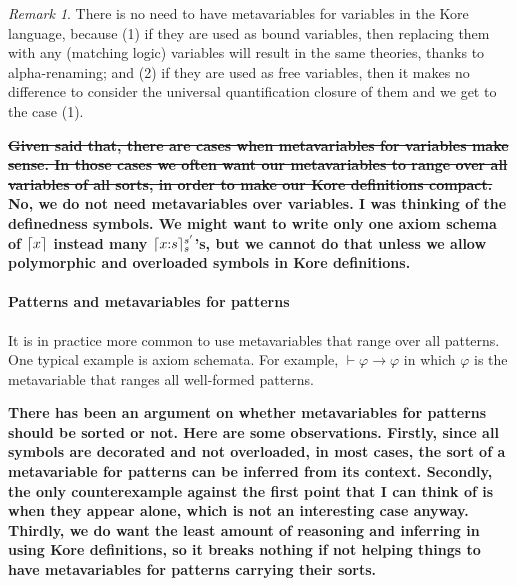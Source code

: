 \documentclass[UTF8]{article}
\newcommand{\comment}[1]
    {\par {\bfseries \color{blue} #1 \par}} %
\newcounter{thmcounter}
\theoremstyle{plain}
\theoremstyle{definition}
\theoremstyle{remark}
\newtheorem{remark}[thmcounter]{Remark}
\newcommand{\cln}{{:}}
\DeclarePairedDelimiter{\ceil}{\lceil}{\rceil}
\begin{document}
\begin{remark}
\label{no_need_to_have_metavariables_for_variables}
There is no need to have metavariables for variables in the Kore language, because (1) if they are used as bound variables, then replacing them with any (matching logic) variables will result in the same theories, thanks to alpha-renaming; and (2) if they are used as free variables, then it makes no difference to consider the universal quantification closure of them and we get to the case (1). 
\comment{\sout{Given said that, there are cases when metavariables for variables make sense. In those cases we often want our metavariables to range over all variables of all sorts, in order to make our Kore definitions compact.} No, we do not need metavariables over variables. I was thinking of the definedness symbols. We might want to write only one axiom schema of $\ceil{x}$ instead many $\ceil{x \cln s}_s^{s'}$'s, but we cannot do that unless we allow polymorphic and overloaded symbols in Kore definitions.}
\end{remark}


\paragraph{Patterns and metavariables for patterns}

It is in practice more common to use metavariables that range over all patterns. One typical example is axiom schemata. For example, $\vdash \varphi \to \varphi$ in which $\varphi$ is the metavariable that ranges all well-formed patterns. 

\comment{There has been an argument on whether metavariables for patterns should be sorted or not. Here are some observations. Firstly, since all symbols are decorated and not overloaded, in most cases, the sort of a metavariable for patterns can be inferred from its context. Secondly, the only counterexample against the first point that I can think of is when they appear alone, which is not an interesting case anyway. Thirdly, we do want the least amount of reasoning and inferring in using Kore definitions, so it breaks nothing if not helping things to have metavariables for patterns carrying their sorts.}
\end{document}
